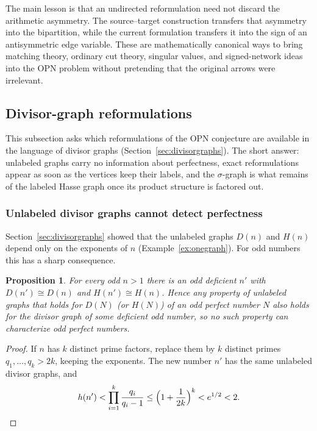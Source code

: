 \documentclass[11pt]{article}
\newtheorem{proposition}[theorem]{Proposition}
\theoremstyle{definition}
\theoremstyle{remark}
\begin{document}
The main lesson is that an undirected reformulation need not discard the
arithmetic asymmetry.  The source--target construction transfers that
asymmetry into the bipartition, while the current formulation transfers it
into the sign of an antisymmetric edge variable.  These are mathematically
canonical ways to bring matching theory, ordinary cut theory, singular values,
and signed-network ideas into the OPN problem without pretending that the
original arrows were irrelevant.

\subsection{Divisor-graph reformulations}\label{sec:divisor}

This subsection asks which reformulations of the OPN conjecture are
available in the language of divisor graphs
(Section~\ref{sec:divisorgraphs}).  The short answer: unlabeled graphs carry
no information about perfectness, exact reformulations appear as soon as the
vertices keep their labels, and the $\sigma$-graph is what remains of the
labeled Hasse graph once its product structure is factored out.

\subsubsection{Unlabeled divisor graphs cannot detect perfectness}

Section~\ref{sec:divisorgraphs} showed that the unlabeled graphs $D(n)$ and
$H(n)$ depend only on the exponents of $n$ (Example~\ref{ex:onegraph}).  For
odd numbers this has a sharp consequence.

\begin{proposition}\label{prop:unlabeled}
For every odd $n>1$ there is an odd deficient $n'$ with
$D(n')\cong D(n)$ and $H(n')\cong H(n)$.  Hence any property of unlabeled
graphs that holds for $D(N)$ (or $H(N)$) of an odd perfect number $N$ also
holds for the divisor graph of some deficient odd number, so no such
property can characterize odd perfect numbers.
\end{proposition}

\begin{proof}
If $n$ has $k$ distinct prime factors, replace them by $k$ distinct primes
$q_1,\dots,q_k>2k$, keeping the exponents.  The new number $n'$ has the same
unlabeled divisor graphs, and
\[
h(n')<\prod_{i=1}^k\frac{q_i}{q_i-1}
\le\Bigl(1+\frac1{2k}\Bigr)^{k}<e^{1/2}<2 .\qedhere
\]
\end{proof}
\end{document}

